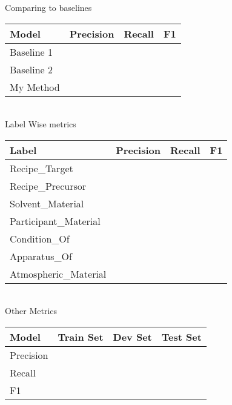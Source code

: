 \documentclass[11pt]{article}
\begin{document}
Comparing to baselines\\

\begin{tabu} to 0.8\textwidth { | X[l] | X[c] | X[c] | X[c] |}
 \hline
 \textbf{Model} & \textbf{Precision} & \textbf{Recall} & \textbf{F1}\\
 \hline
 Baseline 1  &  & &\\
\hline
Baseline 2  &  & &\\
\hline
My Method  &  & &\\
\hline
\end{tabu} \\

Label Wise metrics\\

\begin{tabu} to 0.8\textwidth { | X[l] | X[c] | X[c] | X[c] | }
 \hline
 \textbf{Label} & \textbf{Precision} & \textbf{Recall} & \textbf{F1}\\
 \hline
 Recipe\_Target  & & & \\
\hline
Recipe\_Precursor  & & & \\
\hline
Solvent\_Material  & & & \\
\hline
Participant\_Material  & & & \\
\hline
Condition\_Of  & & & \\
\hline
Apparatus\_Of  & & & \\
\hline
Atmospheric\_Material  & & & \\
\hline
\end{tabu} \\

Other Metrics\\

\begin{tabu} to 0.8\textwidth { | X[l] | X[c] | X[c] | X[c] |}
 \hline
 \textbf{Model} & \textbf{Train Set} & \textbf{Dev Set} & \textbf{Test Set}\\
 \hline
 Precision  &  & &\\
\hline
Recall  &  & &\\
\hline
F1  &  & &\\
\hline
\end{tabu} \\



\end{document}
